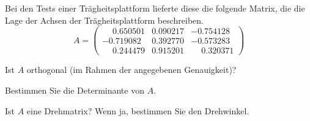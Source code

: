 Bei den Tests einer Trägheitsplattform lieferte diese die folgende Matrix,
die die Lage der Achsen der Trägheitsplattform beschreiben.
\[
A=\begin{pmatrix}
\phantom{-}0.650501&0.090217&          -0.754128\\
  -0.719082&0.392770&          -0.573283\\
\phantom{-}0.244479&0.915201&\phantom{-}0.320371
\end{pmatrix}
\]
\begin{teilaufgaben}
\item Ist $A$ orthogonal (im Rahmen der angegebenen Genauigkeit)?
\item Bestimmen Sie die Determinante von $A$.
\item Ist $A$ eine Drehmatrix? Wenn ja, bestimmen Sie den Drehwinkel.
\end{teilaufgaben}



